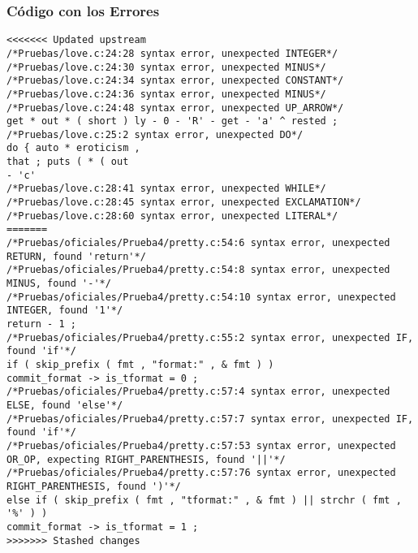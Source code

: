 \documentclass{beamer}
\begin{document}
\begin{frame}[fragile]
\frametitle{C\'odigo con los Errores}
\begin{verbatim}
<<<<<<< Updated upstream
/*Pruebas/love.c:24:28 syntax error, unexpected INTEGER*/
/*Pruebas/love.c:24:30 syntax error, unexpected MINUS*/
/*Pruebas/love.c:24:34 syntax error, unexpected CONSTANT*/
/*Pruebas/love.c:24:36 syntax error, unexpected MINUS*/
/*Pruebas/love.c:24:48 syntax error, unexpected UP_ARROW*/
get * out * ( short ) ly - 0 - 'R' - get - 'a' ^ rested ; 
/*Pruebas/love.c:25:2 syntax error, unexpected DO*/
do { auto * eroticism , 
that ; puts ( * ( out 
- 'c' 
/*Pruebas/love.c:28:41 syntax error, unexpected WHILE*/
/*Pruebas/love.c:28:45 syntax error, unexpected EXCLAMATION*/
/*Pruebas/love.c:28:60 syntax error, unexpected LITERAL*/
=======
/*Pruebas/oficiales/Prueba4/pretty.c:54:6 syntax error, unexpected RETURN, found 'return'*/
/*Pruebas/oficiales/Prueba4/pretty.c:54:8 syntax error, unexpected MINUS, found '-'*/
/*Pruebas/oficiales/Prueba4/pretty.c:54:10 syntax error, unexpected INTEGER, found '1'*/
return - 1 ; 
/*Pruebas/oficiales/Prueba4/pretty.c:55:2 syntax error, unexpected IF, found 'if'*/
if ( skip_prefix ( fmt , "format:" , & fmt ) ) 
commit_format -> is_tformat = 0 ; 
/*Pruebas/oficiales/Prueba4/pretty.c:57:4 syntax error, unexpected ELSE, found 'else'*/
/*Pruebas/oficiales/Prueba4/pretty.c:57:7 syntax error, unexpected IF, found 'if'*/
/*Pruebas/oficiales/Prueba4/pretty.c:57:53 syntax error, unexpected OR_OP, expecting RIGHT_PARENTHESIS, found '||'*/
/*Pruebas/oficiales/Prueba4/pretty.c:57:76 syntax error, unexpected RIGHT_PARENTHESIS, found ')'*/
else if ( skip_prefix ( fmt , "tformat:" , & fmt ) || strchr ( fmt , '%' ) ) 
commit_format -> is_tformat = 1 ; 
>>>>>>> Stashed changes
\end{verbatim}
\end{frame}
\end{document}
